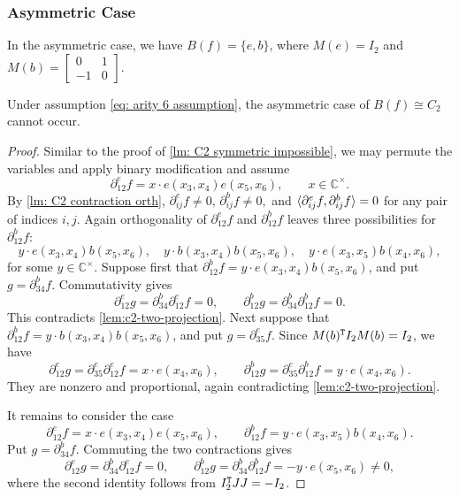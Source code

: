 \subsubsection{Asymmetric Case}
In the asymmetric case, we have $B(f)=\{e,b\}$, where $M(e)=I_2$ and $M(b)=\left[\begin{matrix}
    0 & 1\\
    -1 & 0
\end{matrix}\right].$
\begin{lemma}\label{lm: C2 asymmetric impossible}
    Under assumption \eqref{eq: arity 6 assumption}, the asymmetric case of $B(f)\cong C_2$ cannot occur.
\end{lemma}
\begin{proof}
    Similar to the proof of \cref{lm: C2 symmetric impossible}, we may permute the variables and apply binary modification and assume
    \[
     \partial_{12}^{e}f=x\cdot e(x_3,x_4)e(x_5,x_6),
     \qquad x\in\mathbb C^\times.
    \] 
    By \cref{lm: C2 contraction orth}, $\partial_{ij}^{e}f\neq 0,\,\partial_{ij}^bf\neq 0,$ and $\braket{\partial_{ij}^ef,\partial_{ij}^bf}=0$ for any pair of indices ${i,j}.$ 
    Again orthogonality of $\partial_{12}^{e}f$ and
    $\partial_{12}^{b}f$ leaves three possibilities for $\partial_{12}^bf:$
    \[
     y\cdot e(x_3,x_4)b(x_5,x_6),\quad
     y\cdot b(x_3,x_4)b(x_5,x_6),\quad
     y\cdot e(x_3,x_5)b(x_4,x_6),
    \]
    for some $y\in \mathbb{C}^\times.$
    Suppose first that $\partial_{12}^{b}f=y\cdot e(x_3,x_4)b(x_5,x_6)$, and put $g=\partial_{34}^{b}f$.  Commutativity gives
    \[
     \partial_{12}^{e}g
     =\partial_{34}^{b}\partial_{12}^{e}f=0,
     \qquad
     \partial_{12}^{b}g
     =\partial_{34}^{b}\partial_{12}^{b}f=0.
    \]
    This contradicts \cref{lem:c2-two-projection}.
    Next suppose that $\partial_{12}^bf=y\cdot b(x_3,x_4)b(x_5,x_6)$, and put $g=\partial_{35}^{e}f$.  Since $M(b)^{\tt T}I_2M(b)=I_2$, we have
    \[
     \partial_{12}^{e}g=\partial_{35}^e\partial_{12}^ef=x\cdot e(x_4,x_6),
     \qquad
     \partial_{12}^{b}g=\partial_{35}^e\partial_{12}^bf=y\cdot e(x_4,x_6).
    \]
    They are nonzero and proportional, again contradicting \cref{lem:c2-two-projection}.

    It remains to consider the case
    \begin{equation}
        \partial_{12}^{e}f=x\cdot e(x_3,x_4)e(x_5,x_6),
        \qquad     \partial_{12}^{b}f=y\cdot e(x_3,x_5)b(x_4,x_6).
    \end{equation}
    Put $g=\partial_{34}^{b}f$.  Commuting the two contractions gives
    \begin{equation}\label{eq: C2 asym}
        \partial_{12}^{e}g=\partial_{34}^b\partial_{12}^ef=0,
     \qquad
     \partial_{12}^{b}g=\partial_{34}^b\partial_{12}^bf=-y\cdot e(x_5,x_6)\ne0,
    \end{equation}
    where the second identity follows from $I_2^{\tt T}JJ=-I_2$.


\end{proof}
